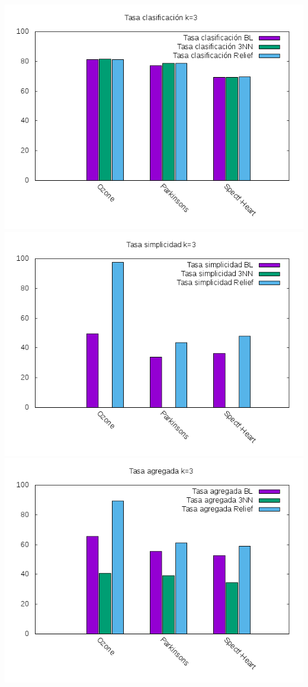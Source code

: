 \documentclass[12pt,a4paper]{article}
\begin{document}
	\includegraphics*[scale=1]{./Imagenes/K3/tasa_clas.png}
	\newline
	\includegraphics*[scale=1]{./Imagenes/K3/tasa_simpl.png}
	\newline
	\includegraphics*[scale=1]{./Imagenes/K3/tasa_agr.png}
\end{document}
